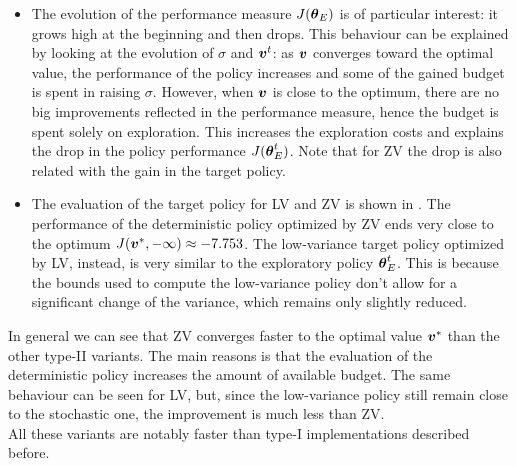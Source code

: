 \begin{itemize}
\item The evolution of the performance measure $J({\boldsymbol{\theta}}_E)$ is of particular interest: it grows high at the beginning and then drops. This behaviour can be explained by looking at the evolution of $\sigma$ and $\boldsymbol{v}^t$: as $\boldsymbol{v}$ converges toward the optimal value, the performance of the policy increases and some of the gained budget is spent in raising $\sigma$. However, when $\boldsymbol{v}$ is close to the optimum, there are no big improvements reflected in the performance measure, hence the budget is spent solely on exploration. This increases the exploration costs and explains the drop in the policy performance $J({\boldsymbol{\theta}}^t_E)$. Note that for ZV the drop is also related with the gain in the target policy.

\item The evaluation of the target policy for LV and ZV is shown in . The performance of the deterministic policy optimized by ZV ends very close to the optimum $J(\boldsymbol{v}^*,-\infty)\approx-7.753$. The low-variance target policy optimized by LV, instead, is very similar to the exploratory policy ${\boldsymbol{\theta}}^t_E$. This is because the bounds used to compute the low-variance policy don't allow for a significant change of the variance, which remains only slightly reduced. 
\end{itemize}

In general we can see that ZV converges faster to the optimal value $\boldsymbol{v}^*$ than the other type-II variants. The main reasons is that the evaluation of the deterministic policy increases the amount of available budget. The same behaviour can be seen for LV, but, since the low-variance policy still remain close to the stochastic one, the improvement is much less than ZV. \\
All these variants are notably faster than type-I implementations described before.

